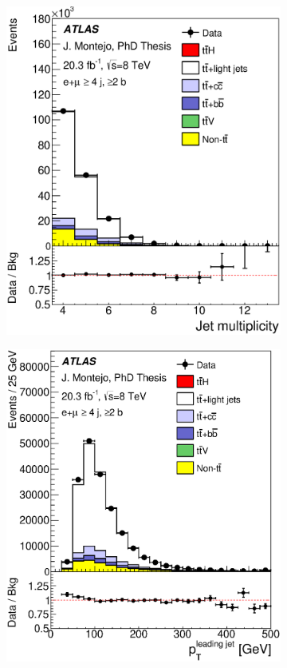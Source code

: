 \begin{figure}[tp!]
\begin{subfigure}{0.32\textwidth}
  \includegraphics[width=\textwidth]{Modeling/Figures/plots_4j2b/jet_n_ELEMUON_4jetin2btagin_NOMINAL.eps}
  \caption{} \end{subfigure}
  \begin{subfigure}{0.32\textwidth}
  \includegraphics[width=\textwidth]{Modeling/Figures/plots_4j2b/jet1_pt_ELEMUON_4jetin2btagin_NOMINAL.eps}

\end{subfigure}
\end{figure}

